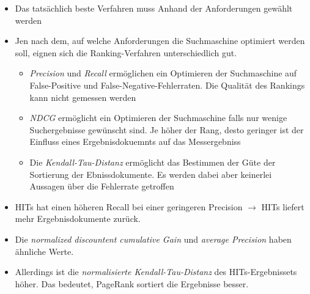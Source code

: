 \begin{frame}[c]

  \begin{itemize}
  \item Das tatsächlich beste Verfahren muss Anhand der Anforderungen gewählt
  werden
  \item Jen nach dem, auf welche Anforderungen die Suchmaschine optimiert werden
  soll, eignen sich die Ranking-Verfahren unterschiedlich gut.
  \begin{itemize}
    \item \textit{Precision} und \textit{Recall} ermöglichen ein Optimieren der
    Suchmaschine auf False-Positive und False-Negative-Fehlerraten. Die Qualität
    des Rankings kann nicht gemessen werden
    \item \textit{NDCG} ermöglicht ein Optimieren der Suchmaschine falls nur
    wenige Suchergebnisse gewünscht sind. Je höher der Rang, desto geringer ist der
    Einfluss eines Ergebnisdokuemnts auf das Messergebniss
    \item Die \textit{Kendall-Tau-Distanz} ermöglicht das Bestimmen der Güte
    der Sortierung der Ebnissdokumente. Es werden dabei aber keinerlei Aussagen
    über die Fehlerrate getroffen
  \end{itemize}
\end{itemize}
\end{frame}

\begin{frame}[c]
  \begin{itemize}
  \item HITs hat einen höheren Recall bei einer geringeren Precision
  $\rightarrow$ HITs liefert mehr Ergebnisdokumente zurück.
\item   Die \textit{normalized discountent cumulative Gain} und
\textit{average Precision} haben ähnliche Werte. 
  \item Allerdings ist die \textit{normalisierte Kendall-Tau-Distanz} des
  HITs-Ergebnissets höher. Das bedeutet, PageRank sortiert die Ergebnisse
  besser.
\end{itemize}

  
\end{frame}